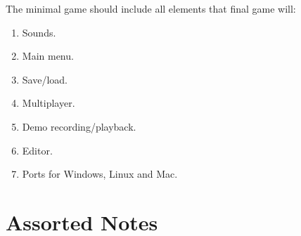 \documentclass[12pt]{article}
\begin{document}
The minimal game should include all elements that final game will:
\begin{enumerate}
    \item
        Sounds.
    \item
        Main menu.
    \item
        Save/load.
    \item
        Multiplayer.
    \item
        Demo recording/playback.
    \item
        Editor.
    \item
        Ports for Windows, Linux and Mac.
\end{enumerate}

\section{Assorted Notes}
\end{document}
